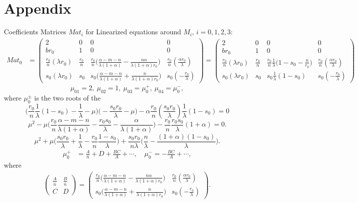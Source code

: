 \documentclass[a4paper,11pt]{article}
\begin{document}
\section*{Appendix}
Coefficients Matrices $Mat_i$ for Linearized equations around $M_i$, $i=0,1,2,3$: 
\begin{align*}
 Mat_0 &= \begin{pmatrix}
          2 & 0 & 0 & 0 \\
          br_0 & 1 & 0 & 0\\
          \frac{r_0}{n}(\lambda r_0) & \frac{r_0}{n} & \frac{r_0}{n}\Big(\frac{\alpha-m-n}{\lambda(1+\alpha)} - \frac{n\alpha}{\lambda(1+\alpha)r_0}\Big) & \frac{r_0}{n}(\frac{\alpha r_0}{\lambda})\\
          s_0(\lambda r_0) & s_0 & s_0\Big(\frac{\alpha-m-n}{\lambda(1+\alpha)} + \frac{n}{\lambda(1+\alpha)r_0}\Big) & s_0(-\frac{r_0}{\lambda})
         \end{pmatrix}
        =\begin{pmatrix}
          2 & 0 & 0 & 0 \\
          br_0 & 1 & 0 & 0\\
          \frac{r_0}{n}(\lambda r_0) & \frac{r_0}{n} & \frac{r_0}{n}\frac{1}{\lambda}\Big(1-s_0-\frac{n}{r_0}\Big) & \frac{r_0}{n}(\frac{\alpha r_0}{\lambda})\\
          s_0(\lambda r_0) & s_0 & s_0\frac{1}{\lambda}(1-s_0) & s_0(-\frac{r_0}{\lambda})
         \end{pmatrix}
\end{align*}
\begin{equation}
 \mu_{01}=2, \ \mu_{02}=1, \ \mu_{03}=\mu_0^+, \ \mu_{04}=\mu_0^-,
\end{equation}
where $\mu_0^\pm$ is the two roots of the 
$$ \Big(\frac{r_0}{n}\frac{1}{\lambda}(1-s_0)-\frac{1}{\lambda}-\mu \Big)\Big(-\frac{s_0r_0}{\lambda}-\mu\Big) - \alpha\frac{r_0}{n}(\frac{s_0 r_0}{\lambda})\frac{1}{\lambda}(1-s_0)=0$$
$$ \mu^2 - \mu\Big(\frac{r_0}{n}\frac{\alpha-m-n}{\lambda(1+\alpha)} - \frac{r_0s_0}{\lambda} - \frac{\alpha}{\lambda(1+\alpha)}\Big) - \frac{r_0}{n}\frac{r_0s_0}{\lambda}(1+\alpha) = 0.$$
$$ \mu^2 + \mu\Big(\frac{s_0r_0}{\lambda} + \frac{1}{\lambda}-\frac{r_0}{n}\frac{1-s_0}{\lambda}\Big) + \frac{s_0r_0}{n\lambda}\Big(\frac{n}{\lambda} - \frac{(1+\alpha)(1-s_0)}{\lambda}\Big).$$
\begin{align*}
 \mu_0^+ &= \frac{A}{n} + D + \frac{BC}{A} + \cdots, \quad \mu_0^- = - \frac{BC}{A} + \cdots,
\end{align*}
where
\begin{align*}
 \begin{pmatrix} \frac{A}{n} & \frac{B}{n} \\ C & D \end{pmatrix} = 
 \begin{pmatrix}
 \frac{r_0}{n}\Big(\frac{\alpha-m-n}{\lambda(1+\alpha)} - \frac{n\alpha}{\lambda(1+\alpha)r_0}\Big) & \frac{r_0}{n}(\frac{\alpha r_0}{\lambda})\\
 s_0\Big(\frac{\alpha-m-n}{\lambda(1+\alpha)} + \frac{n}{\lambda(1+\alpha)r_0}\Big) & s_0(-\frac{r_0}{\lambda})
 \end{pmatrix}.
\end{align*}
\end{document}
